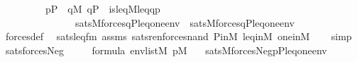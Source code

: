\begin{isabellebody}
\ \ \ \ \ \ \ \ \ {\isacharparenleft}{\kern0pt}p{\isasymin}P\ {\isasymand}\ {\isasymnot}{\isacharparenleft}{\kern0pt}{\isasymexists}q{\isasymin}M{\isachardot}{\kern0pt}\ q{\isasymin}P\ {\isasymand}\ is{\isacharunderscore}{\kern0pt}leq{\isacharparenleft}{\kern0pt}{\isacharhash}{\kern0pt}{\isacharhash}{\kern0pt}M{\isacharcomma}{\kern0pt}leq{\isacharcomma}{\kern0pt}q{\isacharcomma}{\kern0pt}p{\isacharparenright}{\kern0pt}\ {\isasymand}\isanewline
\ \ \ \ \ \ \ \ \ \ \ \ \ \ \ {\isacharparenleft}{\kern0pt}sats{\isacharparenleft}{\kern0pt}M{\isacharcomma}{\kern0pt}forces{\isacharprime}{\kern0pt}{\isacharparenleft}{\kern0pt}{\isasymphi}{\isacharparenright}{\kern0pt}{\isacharcomma}{\kern0pt}{\isacharbrackleft}{\kern0pt}q{\isacharcomma}{\kern0pt}P{\isacharcomma}{\kern0pt}leq{\isacharcomma}{\kern0pt}one{\isacharbrackright}{\kern0pt}{\isacharat}{\kern0pt}env{\isacharparenright}{\kern0pt}\ {\isasymand}\ sats{\isacharparenleft}{\kern0pt}M{\isacharcomma}{\kern0pt}forces{\isacharprime}{\kern0pt}{\isacharparenleft}{\kern0pt}{\isasympsi}{\isacharparenright}{\kern0pt}{\isacharcomma}{\kern0pt}{\isacharbrackleft}{\kern0pt}q{\isacharcomma}{\kern0pt}P{\isacharcomma}{\kern0pt}leq{\isacharcomma}{\kern0pt}one{\isacharbrackright}{\kern0pt}{\isacharat}{\kern0pt}env{\isacharparenright}{\kern0pt}{\isacharparenright}{\kern0pt}{\isacharparenright}{\kern0pt}{\isacharparenright}{\kern0pt}{\isachardoublequoteclose}\isanewline
%
\isadelimproof
\ \ %
\endisadelimproof
%
\isatagproof
{}\isamarkupfalse%
\ forces{\isacharunderscore}{\kern0pt}def\ \isamarkupfalse%
\ sats{\isacharunderscore}{\kern0pt}leq{\isacharunderscore}{\kern0pt}fm\ assms\ sats{\isacharunderscore}{\kern0pt}ren{\isacharunderscore}{\kern0pt}forces{\isacharunderscore}{\kern0pt}nand\ P{\isacharunderscore}{\kern0pt}in{\isacharunderscore}{\kern0pt}M\ leq{\isacharunderscore}{\kern0pt}in{\isacharunderscore}{\kern0pt}M\ one{\isacharunderscore}{\kern0pt}in{\isacharunderscore}{\kern0pt}M\isanewline
\ \ \isamarkupfalse%
\ simp%
\endisatagproof
{\isafoldproof}%
%
\isadelimproof
\isanewline
%
\endisadelimproof
\isanewline
{}\isamarkupfalse%
\ sats{\isacharunderscore}{\kern0pt}forces{\isacharunderscore}{\kern0pt}Neg\ {\isacharcolon}{\kern0pt}\isanewline
\ \ \ \ {\isachardoublequoteopen}{\isasymphi}{\isasymin}formula{\isachardoublequoteclose}\ {\isachardoublequoteopen}env{\isasymin}list{\isacharparenleft}{\kern0pt}M{\isacharparenright}{\kern0pt}{\isachardoublequoteclose}\ {\isachardoublequoteopen}p{\isasymin}M{\isachardoublequoteclose}\isanewline
\ \ \ {\isachardoublequoteopen}sats{\isacharparenleft}{\kern0pt}M{\isacharcomma}{\kern0pt}forces{\isacharparenleft}{\kern0pt}Neg{\isacharparenleft}{\kern0pt}{\isasymphi}{\isacharparenright}{\kern0pt}{\isacharparenright}{\kern0pt}{\isacharcomma}{\kern0pt}{\isacharbrackleft}{\kern0pt}p{\isacharcomma}{\kern0pt}P{\isacharcomma}{\kern0pt}leq{\isacharcomma}{\kern0pt}one{\isacharbrackright}{\kern0pt}{\isacharat}{\kern0pt}env{\isacharparenright}{\kern0pt}\ {\isasymlongleftrightarrow}\isanewline

\end{isabellebody}
